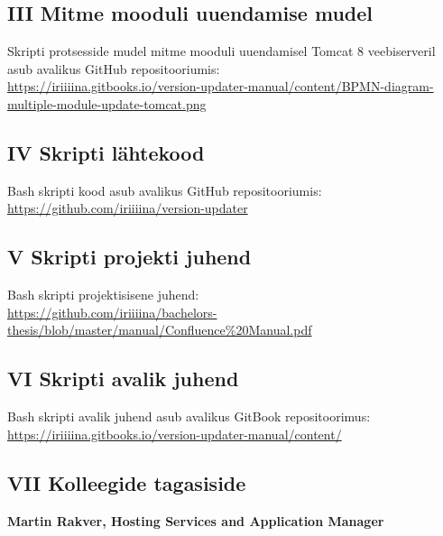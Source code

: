\documentclass[12pt]{article}
\begin{document}
  \subsection*{III Mitme mooduli uuendamise mudel}
  \label{bpmn-many}
  
  Skripti protsesside mudel mitme mooduli uuendamisel Tomcat 8 veebiserveril asub avalikus GitHub repositooriumis:\\
  \url{https://iriiiina.gitbooks.io/version-updater-manual/content/BPMN-diagram-multiple-module-update-tomcat.png}
  
  \subsection*{IV Skripti lähtekood}
  \label{source-code}
  
  Bash skripti kood asub avalikus GitHub repositooriumis:\\
  \url{https://github.com/iriiiina/version-updater}
  
  \subsection*{V Skripti projekti juhend}
  \label{documentation}
  
  Bash skripti projektisisene juhend:\\
  \url{https://github.com/iriiiina/bachelors-thesis/blob/master/manual/Confluence%20Manual.pdf}
  
  \subsection*{VI Skripti avalik juhend}
  \label{public-documentation}
  
  Bash skripti avalik juhend asub avalikus GitBook repositoorimus:\\
  \url{https://iriiiina.gitbooks.io/version-updater-manual/content/}
  
  \subsection*{VII Kolleegide tagasiside}
  \label{feedback}
  
  \textbf{Martin Rakver, Hosting Services and Application Manager}
  
\end{document}
